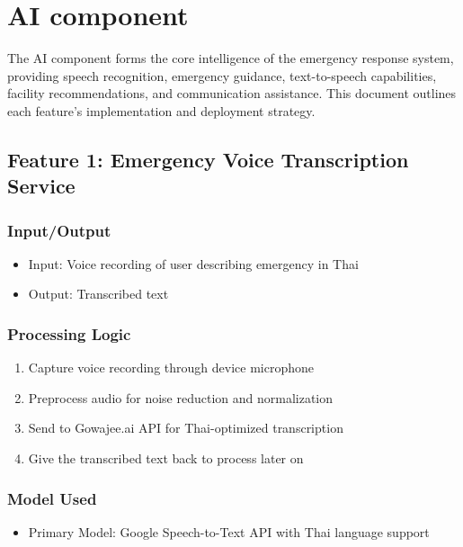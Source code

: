 
\section{AI component}
\label{section:ai-component}

The AI component forms the core intelligence of the emergency response system, providing speech recognition, emergency guidance, text-to-speech capabilities, facility recommendations, and communication assistance. This document outlines each feature's implementation and deployment strategy.

\subsection{Feature 1: Emergency Voice Transcription Service}

    \subsubsection{Input/Output}
    \begin{itemize}
        \item Input:  Voice recording of user describing emergency in Thai
        \item Output: Transcribed text 
    \end{itemize}

    \subsubsection{Processing Logic}
    \begin{enumerate}
        \item Capture voice recording through device microphone
        \item Preprocess audio for noise reduction and normalization
        \item Send to Gowajee.ai API for Thai-optimized transcription
        \item Give the transcribed text back to process later on
    \end{enumerate}

\subsubsection{Model Used}
\begin{itemize}
    \item Primary Model: Google Speech-to-Text API with Thai language support
\end{itemize}

